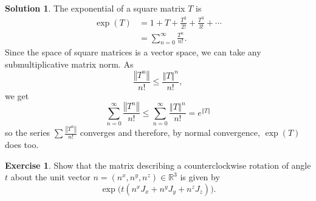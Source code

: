 \documentclass[11pt, a4paper]{report}
\theoremstyle{definition}
\newtheorem{exercise}{Exercise}[part]
\newtheorem{solution}{Solution}[part]
\newenvironment{ex}{\begin{exercise}}{\end{exercise}\pagebreak[1]}
\newenvironment{sol}{\begin{solution}}{\end{solution}\pagebreak[3]}
\newcommand*{\norm}[1]{\ensuremath{\left\Vert#1\right\Vert}}
\renewcommand{\leq}{\leqslant}
\begin{document}
\begin{sol}

The exponential of a square matrix $T$ is
\begin{align*}
    \exp(T) &= 1 + T + \frac{T^2}{2!} + \frac{T^3}{3!} + \cdots \\
            &= \sum_{n = 0}^\infty \frac{T^n}{n!}.
\end{align*}
Since the space of square matrices is a vector space, we can take any submultiplicative matrix norm. As
\[
    \frac{\norm{T^n}}{n!} \leq \frac{\norm{T}^n}{n!},
\]
we get
\[
    \sum_{n = 0}^\infty \frac{\norm{T^n}}{n!} \leq \sum_{n = 0}^\infty \frac{\norm{T}^n}{n!} = e^{\norm{T}}
\]
so the series $\sum \frac{\norm{T^n}}{n!}$ converges and therefore, by normal convergence, $\exp(T)$ does too.

\end{sol}

\begin{ex}

Show that the matrix describing a counterclockwise rotation of angle $t$ about the unit vector $n = (n^x, n^y, n^z) \in \mathbb{R}^3$ is given by
\[
    \exp \bigl( t(n^x \! J_x + n^y \! J_y + n^z \! J_z) \bigr).
\]

\end{ex}
\end{document}
